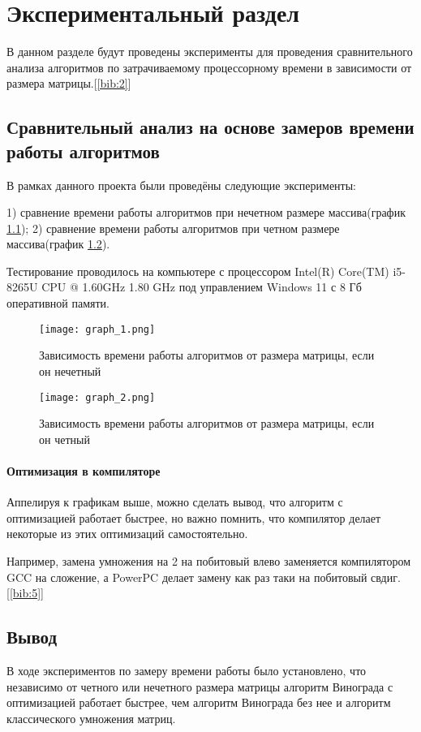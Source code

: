 \chapter{Экспериментальный раздел}
\label{cha:research}
    В данном разделе будут проведены эксперименты для проведения 
    сравнительного анализа алгоритмов по затрачиваемому процессорному 
    времени в зависимости от размера матрицы.[\ref{bib:2}]
    \section{Сравнительный анализ на основе замеров времени работы алгоритмов}
        В рамках данного проекта были проведёны следующие эксперименты:

        1) сравнение времени работы алгоритмов при нечетном размере массива(график \ref{graph:test:1});
        2) сравнение времени работы алгоритмов при четном размере массива(график \ref{graph:test:2}).

        
        Тестирование проводилось на компьютере с процессором
        Intel(R) Core(TM) i5-8265U CPU @ 1.60GHz 1.80 GHz под управлением Windows 11 с 8 Гб оперативной памяти.\\

        \begin{figure}[h!]
            \centering
            \texttt{[image: graph\_1.png]}
            \caption{Зависимость времени работы алгоритмов от размера матрицы, если он нечетный}
            \label{graph:test:1}
        \end{figure}
        \newpage
        \begin{figure}[h!]
            \texttt{[image: graph\_2.png]}
            \caption{Зависимость времени работы алгоритмов от размера матрицы, если он четный}
            \label{graph:test:2}
        \end{figure}
        \newpage

    \subsubsection*{Оптимизация в компиляторе}
    \par Аппелируя к графикам выше, можно сделать вывод, что алгоритм с оптимизацией работает быстрее, но важно помнить, что компилятор делает некоторые из этих оптимизаций самостоятельно.
    \par Например, замена умножения на 2 на побитовый влево заменяется компилятором GCC на сложение, а PowerPC делает замену как раз таки на побитовый свдиг.[\ref{bib:5}] 

    \section{Вывод}
        \par В ходе экспериментов по замеру времени работы было установлено, что независимо от четного или нечетного размера матрицы алгоритм Винограда с оптимизацией работает быстрее, чем алгоритм Винограда без нее и алгоритм классического умножения матриц.



\newpage